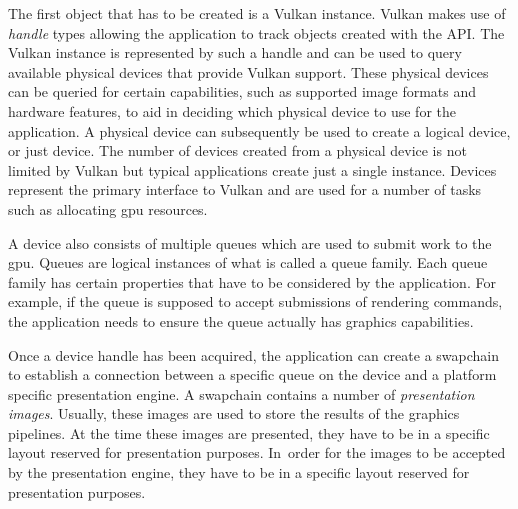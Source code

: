     The first object that has to be created is a Vulkan instance.
    Vulkan makes use of \textit{handle} types allowing the application to track objects created with the API.
    The Vulkan instance is represented by such a handle and can be used to query available physical devices that provide Vulkan support.
    These physical devices can be queried for certain capabilities, such as supported image formats and hardware features, to aid in deciding which physical device to use for the application.
    A physical device can subsequently be used to create a logical device, or just device.
    The number of devices created from a physical device is not limited by Vulkan but typical applications create just a single instance.
    Devices represent the primary interface to Vulkan and are used for a number of tasks such as allocating \gls{gpu} resources.

    A device also consists of multiple queues which are used to submit work to the \gls{gpu}.
    Queues are logical instances of what is called a queue family.
    Each queue family has certain properties that have to be considered by the application.
    For example, if the queue is supposed to accept submissions of rendering commands, the application needs to ensure the queue actually has graphics capabilities.


    Once a device handle has been acquired, the application can create a swapchain to establish a connection between a specific queue on the device and a platform specific presentation engine.
    A swapchain contains a number of \textit{presentation images}.
    Usually, these images are used to store the results of the graphics pipelines.
    At the time these images are presented, they have to be in a specific layout reserved for presentation purposes.
    In~order for the images to be accepted by the presentation engine, they have to be in a specific layout reserved for presentation purposes.

